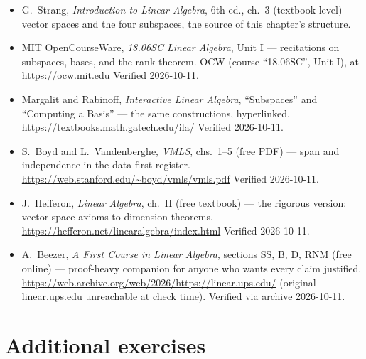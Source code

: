 \begin{itemize}
\item G.~Strang, \emph{Introduction to Linear Algebra}, 6th ed., ch.~3
(textbook level) --- vector spaces and the four subspaces, the source
of this chapter's structure.
\item MIT OpenCourseWare, \emph{18.06SC Linear Algebra}, Unit I ---
recitations on subspaces, bases, and the rank theorem. \newline
OCW (course ``18.06SC'', Unit I), at \url{https://ocw.mit.edu}
Verified 2026-10-11.
\item Margalit and Rabinoff, \emph{Interactive Linear Algebra},
``Subspaces'' and ``Computing a Basis'' --- the same constructions,
hyperlinked.\newline
\url{https://textbooks.math.gatech.edu/ila/}
Verified 2026-10-11.
\item S.~Boyd and L.~Vandenberghe, \emph{VMLS}, chs.~1--5 (free PDF) ---
span and independence in the data-first register.\newline
\url{https://web.stanford.edu/~boyd/vmls/vmls.pdf}
Verified 2026-10-11.
\item J.~Hefferon, \emph{Linear Algebra}, ch.~II (free textbook) ---
the rigorous version: vector-space axioms to dimension theorems.
\newline
\url{https://hefferon.net/linearalgebra/index.html}
Verified 2026-10-11.
\item A.~Beezer, \emph{A First Course in Linear Algebra}, sections
SS, B, D, RNM (free online) --- proof-heavy companion for anyone who
wants every claim justified. \newline
\url{https://web.archive.org/web/2026/https://linear.ups.edu/}
(original linear.ups.edu unreachable at check time).
Verified via archive 2026-10-11.
\end{itemize}

\section*{Additional exercises}

